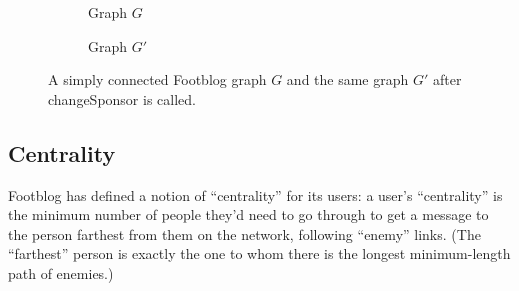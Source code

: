 \documentclass[11pt, oneside]{article}   	%
\theoremstyle{definition}
\theoremstyle{remark}
\begin{document}
\begin{enumerate}
\begin{figure}[h]
\begin{subfigure}[b]{0.45\columnwidth}
         \caption{Graph $G$}
		 \label{Graph1}
    \end{subfigure}
    \begin{subfigure}[b]{0.45\columnwidth}
    		\centering
         \caption{Graph $G'$}
		 \label{Graph2}
    \end{subfigure}
    \caption{A simply connected Footblog graph $G$ and the same graph $G'$ after changeSponsor is called.}
    \label{polynomials}
	\end{figure}

   
\end{enumerate}

\subsection{Centrality}
Footblog has defined a notion of ``centrality'' for its users: a user's ``centrality'' is the minimum number of people they'd need to go through to get a message to the person farthest from them on the network, following ``enemy'' links. (The ``farthest'' person is exactly the one to whom there is the longest minimum-length path of enemies.)
\end{document}
